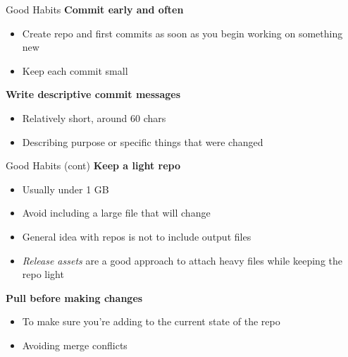 \documentclass[aspectratio=169]{beamer}
\begin{document}
\begin{frame}{Good Habits}\small
  \vspace{4ex}
  {\bf\darkgreen Commit early and often}
  \begin{itemize}
    \item[] Create repo and first commits as soon as you begin working on
    something new\\[1ex]
    \item[] Keep each commit small
    \\[1ex]
  \end{itemize}
  \vspace{6ex}
  {\bf\darkgreen Write descriptive commit messages}\\
  \begin{itemize}
    \item[] Relatively short, around 60 chars
    \item[] Describing purpose or specific things that were changed
  \end{itemize}
  \vspace{4ex}
\end{frame}


\begin{frame}{Good Habits (cont)}\small
  \vspace{4ex}
  {\bf\darkgreen Keep a light repo}\\
  \begin{itemize}
    \item[] Usually under 1 GB
    \item[] Avoid including a large file that will change
    \item[] General idea with repos is not to include output files
    \item[] {\it Release assets} are a good approach to attach heavy files while
    keeping the repo light
  \end{itemize}
  \vspace{6ex}
  {\bf\darkgreen Pull before making changes}\\
  \begin{itemize}
    \item[] To make sure you're adding to the current state of the repo
    \item[] Avoiding merge conflicts
  \end{itemize}
  \vspace{4ex}
\end{frame}
\end{document}
